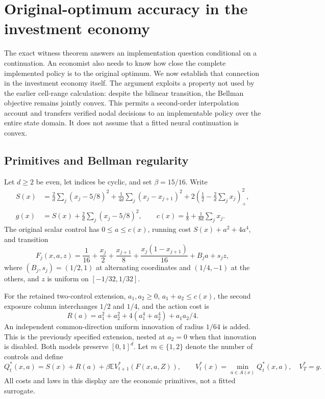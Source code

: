 \section{Original-optimum accuracy in the investment economy}\label{sec:accuracy62}
The exact witness theorem answers an implementation question conditional on a continuation. An economist also needs to know how close the complete implemented policy is to the original optimum. We now establish that connection in the investment economy itself. The argument exploits a property not used by the earlier cell-range calculation: despite the bilinear transition, the Bellman objective remains jointly convex. This permits a second-order interpolation account and transfers verified nodal decisions to an implementable policy over the entire state domain. It does not assume that a fitted neural continuation is convex.

\subsection{Primitives and Bellman regularity}
Let $d\ge2$ be even, let indices be cyclic, and set $\beta=15/16$. Write
\begin{align*}
 S(x)&=\frac2d\sum_j(x_j-5/8)^2+
       \frac1{4d}\sum_j(x_j-x_{j+1})^2+
       2\left(\frac12-\frac2d\sum_jx_j\right)_+^2,\\
 g(x)&=S(x)+\frac2d\sum_j(x_j-5/8)^2,\qquad
 c(x)=\frac18+\frac1{8d}\sum_jx_j.
\end{align*}
The original scalar control has $0\le a\le c(x)$, running cost $S(x)+a^2+4a^4$, and transition
\[
 F_j(x,a,z)=\frac1{16}+\frac{x_j}{2}+\frac{x_{j+1}}8+
       \frac{x_j(1-x_{j+1})}{16}+B_ja+s_jz,
\]
where $(B_j,s_j)=(1/2,1)$ at alternating coordinates and $(1/4,-1)$ at the others, and $z$ is uniform on $[-1/32,1/32]$.

For the retained two-control extension, $a_1,a_2\ge0$, $a_1+a_2\le c(x)$, the second exposure column interchanges $1/2$ and $1/4$, and the action cost is
\[
 R(a)=a_1^2+a_2^2+4(a_1^4+a_2^4)+a_1a_2/4.
\]
An independent common-direction uniform innovation of radius $1/64$ is added. This is the previously specified extension, nested at $a_2=0$ when that innovation is disabled. Both models preserve $[0,1]^d$. Let $m\in\{1,2\}$ denote the number of controls and define
\[
 Q_t^*(x,a)=S(x)+R(a)+\beta\mathbb E V_{t+1}^*(F(x,a,Z)),
 \qquad V_t^*(x)=\min_{a\in A(x)}Q_t^*(x,a),\quad V_T^*=g.
\]
All costs and laws in this display are the economic primitives, not a fitted surrogate.

